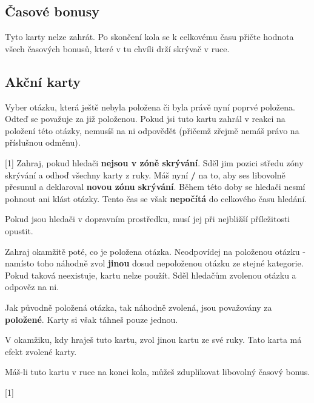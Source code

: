 

\subsection{Časové bonusy}

Tyto karty nelze zahrát. Po skončení kola se k celkovému času přičte hodnota všech časových bonusů, které v tu chvíli drží skrývač v ruce.

\begin{cards}
\end{cards}

\subsection{Akční karty}

\begin{cards}
	 Vyber otázku, která ještě nebyla položena či byla právě nyní poprvé položena. Odteď se považuje za již položenou. Pokud jsi tuto kartu zahrál v reakci na položení této otázky, nemusíš na ni odpovědět (přičemž zřejmě nemáš právo na příslušnou odměnu).

	 Zahraj, pokud hledači \textbf{nejsou v zóně skrývání}. Sděl jim pozici středu zóny skrývání a odhoď všechny karty z ruky. Máš nyní \textbf{\timehidingmove/} na to, aby ses libovolně přesunul a deklaroval \textbf{novou zónu skrývání}. Během této doby se hledači nesmí pohnout ani klást otázky. Tento čas se však \textbf{nepočítá} do celkového času hledání.

	Pokud jsou hledači v dopravním prostředku, musí jej při nejbližší příležitosti opustit.



	 Zahraj okamžitě poté, co je položena otázka. Neodpovídej na položenou otázku - namísto toho náhodně zvol \textbf{jinou} dosud nepoloženou otázku ze stejné kategorie. Pokud taková neexistuje, kartu nelze použít. Sděl hledačům zvolenou otázku a odpověz na ni.

	Jak původně položená otázka, tak náhodně zvolená, jsou považovány za \textbf{položené}. Karty si však táhneš pouze jednou.

	 V okamžiku, kdy hraješ tuto kartu, zvol jinou kartu ze své ruky. Tato karta má efekt zvolené karty.

	Máš-li tuto kartu v ruce na konci kola, můžeš zduplikovat libovolný časový bonus.

\end{cards}

